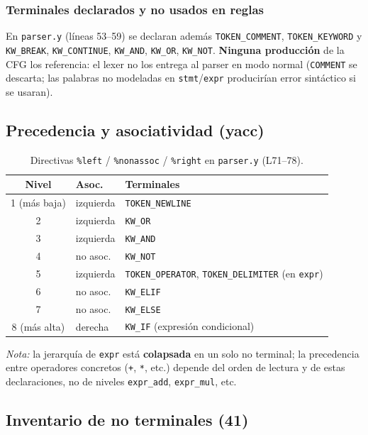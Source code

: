 \subsubsection{Terminales declarados y no usados en reglas}
En \texttt{parser.y} (líneas 53--59) se declaran además \texttt{TOKEN\_COMMENT}, \texttt{TOKEN\_KEYWORD} y \texttt{KW\_BREAK}, \texttt{KW\_CONTINUE}, \texttt{KW\_AND}, \texttt{KW\_OR}, \texttt{KW\_NOT}. \textbf{Ninguna producción} de la CFG los referencia: el lexer no los entrega al parser en modo normal (\texttt{COMMENT} se descarta; las palabras no modeladas en \texttt{stmt}/\texttt{expr} producirían error sintáctico si se usaran).

\subsection{Precedencia y asociatividad (yacc)}
\label{sub:precedencia-cfg}

\begin{table}[H]
\centering
\caption{Directivas \texttt{\%left} / \texttt{\%nonassoc} / \texttt{\%right} en \texttt{parser.y} (L71--78).}
\label{tab:precedencia-cfg}
\begin{tabular}{@{}cll@{}}
\toprule
\textbf{Nivel} & \textbf{Asoc.} & \textbf{Terminales} \\
\midrule
1 (más baja) & izquierda & \texttt{TOKEN\_NEWLINE} \\
2 & izquierda & \texttt{KW\_OR} \\
3 & izquierda & \texttt{KW\_AND} \\
4 & no asoc. & \texttt{KW\_NOT} \\
5 & izquierda & \texttt{TOKEN\_OPERATOR}, \texttt{TOKEN\_DELIMITER} (en \texttt{expr}) \\
6 & no asoc. & \texttt{KW\_ELIF} \\
7 & no asoc. & \texttt{KW\_ELSE} \\
8 (más alta) & derecha & \texttt{KW\_IF} (expresión condicional) \\
\bottomrule
\end{tabular}
\end{table}

\textit{Nota:} la jerarquía de \texttt{expr} está \textbf{colapsada} en un solo no terminal; la precedencia entre operadores concretos (\texttt{+}, \texttt{*}, etc.) depende del orden de lectura y de estas declaraciones, no de niveles \texttt{expr\_add}, \texttt{expr\_mul}, etc.

\subsection{Inventario de no terminales (41)}
\label{sub:inventario-nt}

